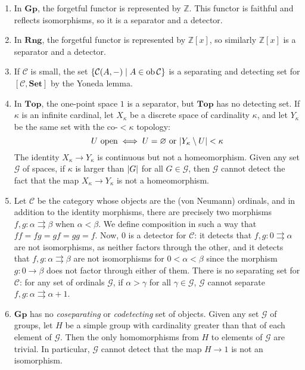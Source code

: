 \begin{example}
    \begin{enumerate}
        \item In \( \mathbf{Gp} \), the forgetful functor is represented by \( \mathbb Z \).
        This functor is faithful and reflects isomorphisms, so it is a separator and a detector.
        \item In \( \mathbf{Rng} \), the forgetful functor is represented by \( \mathbb Z[x] \), so similarly \( \mathbb Z[x] \) is a separator and a detector.
        \item If \( \mathcal C \) is small, the set \( \qty{\mathcal C(A, -) \mid A \in \operatorname{ob}\mathcal C} \) is a separating and detecting set for \( [\mathcal C, \mathbf{Set}] \) by the Yoneda lemma.
        \item In \( \mathbf{Top} \), the one-point space \( 1 \) is a separator, but \( \mathbf{Top} \) has no detecting set.
        If \( \kappa \) is an infinite cardinal, let \( X_\kappa \) be a discrete space of cardinality \( \kappa \), and let \( Y_\kappa \) be the same set with the co-\( < \kappa \) topology:
        \[ U \text{ open} \iff U = \varnothing \text{ or } \abs{Y_\kappa \setminus U} < \kappa \]
        The identity \( X_\kappa \to Y_\kappa \) is continuous but not a homeomorphism.
        Given any set \( \mathcal G \) of spaces, if \( \kappa \) is larger than \( \abs{G} \) for all \( G \in \mathcal G \), then \( \mathcal G \) cannot detect the fact that the map \( X_\kappa \to Y_\kappa \) is not a homeomorphism.
        \item Let \( \mathcal C \) be the category whose objects are the (von Neumann) ordinals, and in addition to the identity morphisms, there are precisely two morphisms \( f, g : \alpha \rightrightarrows \beta \) when \( \alpha < \beta \).
        We define composition in such a way that \( ff = fg = gf = gg = f \).
        Now, \( 0 \) is a detector for \( \mathcal C \): it detects that \( f, g : 0 \rightrightarrows \alpha \) are not isomorphisms, as neither factors through the other, and it detects that \( f, g : \alpha \rightrightarrows \beta \) are not isomorphisms for \( 0 < \alpha < \beta \) since the morphism \( g : 0 \to \beta \) does not factor through either of them.
        There is no separating set for \( \mathcal C \): for any set of ordinals \( \mathcal G \), if \( \alpha > \gamma \) for all \( \gamma \in \mathcal G \), \( \mathcal G \) cannot separate \( f, g : \alpha \rightrightarrows \alpha + 1 \).
        \item \( \mathbf{Gp} \) has no \emph{coseparating} or \emph{codetecting} set of objects.
        Given any set \( \mathcal G \) of groups, let \( H \) be a simple group with cardinality greater than that of each element of \( \mathcal G \).
        Then the only homomorphisms from \( H \) to elements of \( \mathcal G \) are trivial.
        In particular, \( \mathcal G \) cannot detect that the map \( H \to 1 \) is not an isomorphism.
    \end{enumerate}
\end{example}

